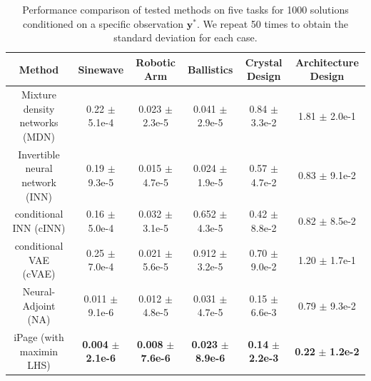 \documentclass[letterpaper]{article}
\begin{document}
\begin{table}[!h]
\footnotesize
\centering
\caption{Performance comparison of tested methods on five tasks for 1000 solutions conditioned on a specific observation $\mathbf{y}^*$. We repeat 50 times to obtain the standard deviation for each case.}
\label{tab:1_y}
\begin{adjustbox}{width=0.22\columnwidth}
\begin{tabular}{@{}cccccc@{}}
\toprule
Method & Sinewave     & Robotic Arm     & Ballistics     & Crystal Design  & Architecture Design \\ \midrule
Mixture density networks (MDN)    & 0.22 $\pm$ 5.1e-4 & 0.023 $\pm$ 2.3e-5  & 0.041 $\pm$ 2.9e-5 & 0.84 $\pm$ 3.3e-2   & 1.81 $\pm$ 2.0e-1\\
Invertible neural network (INN)    & 0.19 $\pm$ 9.3e-5  & 0.015 $\pm$ 4.7e-5  & {0.024} $\pm$ 1.9e-5 & 0.57 $\pm$ 4.7e-2  & 0.83 $\pm$ 9.1e-2 \\
conditional INN (cINN)   & 0.16 $\pm$ 5.0e-4  & 0.032 $\pm$ 3.1e-5   & 0.652 $\pm$ 4.3e-5   & 0.42 $\pm$ 8.8e-2 & 0.82 $\pm$ 8.5e-2   \\
conditional VAE (cVAE)   & 0.25 $\pm$ 7.0e-4  & 0.021 $\pm$ 5.6e-5   & 0.912 $\pm$ 3.2e-5   & 0.70 $\pm$ 9.0e-2  & 1.20 $\pm$ 1.7e-1 \\
Neural-Adjoint (NA)     & 0.011 $\pm$ 9.1e-6 & 0.012 $\pm$ 4.8e-5  & 0.031 $\pm$ 4.7e-5   & {0.15} $\pm$ 6.6e-3  & 0.79 $\pm$ 9.3e-2 \\ \midrule
iPage (with maximin LHS) & {\bf 0.004} $\pm$ {\bf 2.1e-6} & {\bf0.008} $\pm$ {\bf7.6e-6}  & {\bf 0.023} $\pm$ {\bf 8.9e-6}   & {\bf0.14} $\pm$ {\bf 2.2e-3}  & {\bf 0.22} $\pm$ {\bf 1.2e-2}  \\ \bottomrule
\end{tabular}
\end{adjustbox}
\end{table}
\end{document}
